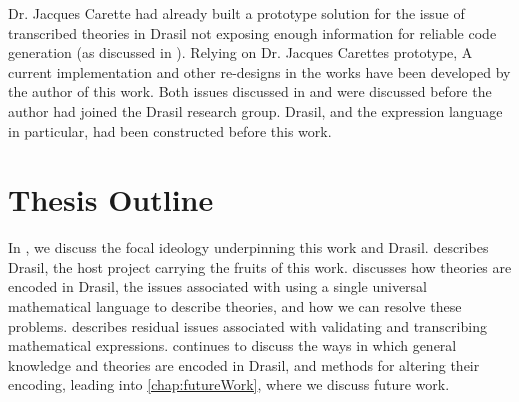 Dr. Jacques Carette had already built a prototype solution  for the issue of transcribed theories in Drasil not exposing enough
information for reliable code generation (as discussed in
). Relying on Dr. Jacques Carettes prototype, A current
implementation and other re-designs in the works have been developed by the
author of this work. Both issues discussed in  and
 were discussed before the author had joined the Drasil
research group. Drasil, and the expression language in particular, had been
constructed before this work.

\section{Thesis Outline}
\label{sec:intro:outline}

In , we discuss the focal ideology underpinning this work
and Drasil.  describes Drasil, the host project carrying the
fruits of this work.  discusses how theories are encoded
in Drasil, the issues associated with using a single universal mathematical
language to describe theories, and how we can resolve these problems.
 describes residual issues associated with validating and
transcribing mathematical expressions.  continues to
discuss the ways in which general knowledge and theories are encoded in Drasil,
and methods for altering their encoding, leading into \cref{chap:futureWork},
where we discuss future work.
